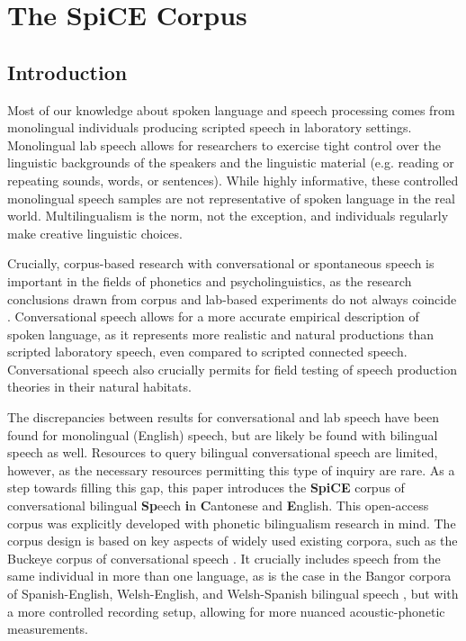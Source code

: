 \chapter{The SpiCE Corpus}
\label{ch:Corpus}

\section{Introduction}\label{ch2:sec:introduction}
Most of our knowledge about spoken language and speech processing comes from monolingual individuals producing scripted speech in laboratory settings. Monolingual lab speech allows for researchers to exercise tight control over the linguistic backgrounds of the speakers and the linguistic material (e.g. reading or repeating sounds, words, or sentences). While highly informative, these controlled monolingual speech samples are not representative of spoken language in the real world. Multilingualism is the norm, not the exception, and individuals regularly make creative linguistic choices. 

Crucially, corpus-based research with conversational or spontaneous speech is important in the fields of phonetics and psycholinguistics, as the research conclusions drawn from corpus and lab-based experiments do not always coincide \citep{gahl_2012_reduce}. Conversational speech allows for a more accurate empirical description of spoken language, as it represents more realistic and natural productions than scripted laboratory speech, even compared to scripted connected speech. Conversational speech also crucially permits for field testing of speech production theories \citep{bell_2009_predictability, gahl_2012_reduce} in their natural habitats. 

The discrepancies between results for conversational and lab speech have been found for monolingual (English) speech, but are likely be found with bilingual speech as well. Resources to query bilingual conversational speech are limited, however, as the necessary resources permitting this type of inquiry are rare. As a step towards filling this gap, this paper introduces the \textbf{SpiCE} corpus of conversational bilingual \textbf{Sp}eech \textbf{i}n \textbf{C}antonese and \textbf{E}nglish. This open-access corpus was explicitly developed with phonetic bilingualism research in mind. The corpus design is based on key aspects of widely used existing corpora, such as the Buckeye corpus of conversational speech \citep{pitt_2005_buckeye}. It crucially includes speech from the same individual in more than one language, as is the case in the Bangor corpora of Spanish-English, Welsh-English, and Welsh-Spanish bilingual speech \citep{deuchar_2014_corpora}, but with a more controlled recording setup, allowing for more nuanced acoustic-phonetic measurements. 

